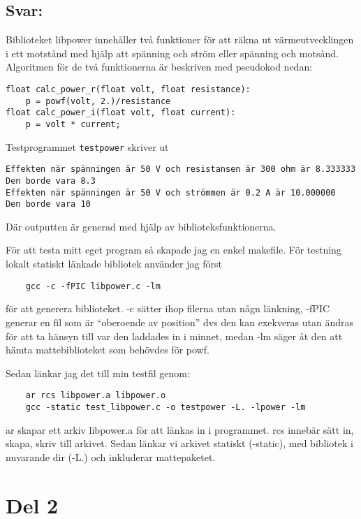 \documentclass[10pt, a4paper]{article}
\begin{document}
\subsection*{Svar:}

Biblioteket libpower innehåller två funktioner för att räkna ut värmeutvecklingen i ett motstånd med hjälp att spänning och ström eller spänning och motsånd. Algoritmen för de två funktionerna är beskriven med pseudokod nedan:
\begin{verbatim}
float calc_power_r(float volt, float resistance):
    p = powf(volt, 2.)/resistance
float calc_power_i(float volt, float current):
    p = volt * current;
\end{verbatim}
Testprogrammet \verb#testpower# skriver ut
\begin{verbatim}
Effekten när spänningen är 50 V och resistansen är 300 ohm är 8.333333
Den borde vara 8.3
Effekten när spänningen är 50 V och strömmen är 0.2 A är 10.000000
Den borde vara 10
\end{verbatim}
Där outputten är generad med hjälp av biblioteksfunktionerna.

För att testa mitt eget program så skapade jag en enkel makefile. För testning lokalt statiskt länkade bibliotek använder jag först
\begin{verbatim}
    gcc -c -fPIC libpower.c -lm
\end{verbatim}
för att generera biblioteket. -c sätter ihop filerna utan någn länkning, -fPIC generar en fil som är ``oberoende av position'' dvs den kan exekveras utan ändras för att ta hänsyn till var den laddades in i minnet,  medan -lm säger åt den att hämta mattebiblioteket som behövdes för powf.

Sedan länkar jag det till min testfil genom:
\begin{verbatim}
    ar rcs libpower.a libpower.o
    gcc -static test_libpower.c -o testpower -L. -lpower -lm
\end{verbatim}
ar skapar ett arkiv libpower.a för att länkas in i programmet. rcs innebär sätt in, skapa, skriv till arkivet. Sedan länkar vi arkivet statiskt (-static), med bibliotek i nuvarande dir (-L.) och inkluderar mattepaketet.

\cleardoublepage

\section*{Del 2}\label{sec:del2}
\end{document}
